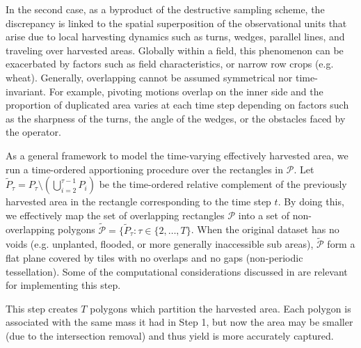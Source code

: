  In the second case, as a byproduct
of the destructive sampling scheme, the discrepancy is linked to the
spatial superposition of the observational units that arise due to
local harvesting dynamics such as turns, wedges, parallel lines, and
traveling over harvested areas. Globally within a field, this
phenomenon can be exacerbated by factors such as field
characteristics, or narrow row crops (e.g. wheat). Generally,
overlapping cannot be assumed symmetrical nor time-invariant. For
example, pivoting motions overlap on the inner side and the proportion
of duplicated area varies at each time step depending on factors such
as the sharpness of the turns, the angle of the wedges, or the
obstacles faced by the operator.

 As a general framework to model the
time-varying effectively harvested area, we run a time-ordered
apportioning procedure over the rectangles in $\mathcal{P}$. Let
$\tilde{P}_\tau = P_\tau \setminus \left( \bigcup_{i = 2}^{\tau - 1}
P_i \right)$ be the time-ordered relative complement of the previously
harvested area in the rectangle corresponding to the time step $t$. By
doing this, we effectively map the set of overlapping rectangles
$\mathcal{P}$ into a set of non-overlapping polygons
$\tilde{\mathcal{P}} = \{\tilde{P}_{\tau}: \tau \in \{2, \dots, T
\}$. When the original dataset has no voids (e.g. unplanted, flooded,
or more generally inaccessible sub areas), $\tilde{\mathcal{P}}$ form
a flat plane covered by tiles with no overlaps and no gaps
(non-periodic tessellation). Some of the computational considerations
discussed in \cite{Drummond1999} are relevant for implementing this
step.

This step creates $T$ polygons which partition the harvested area.
Each polygon is associated with the same mass it had in Step 1, but
now the area may be smaller (due to the intersection removal) and thus
yield is more accurately captured.

